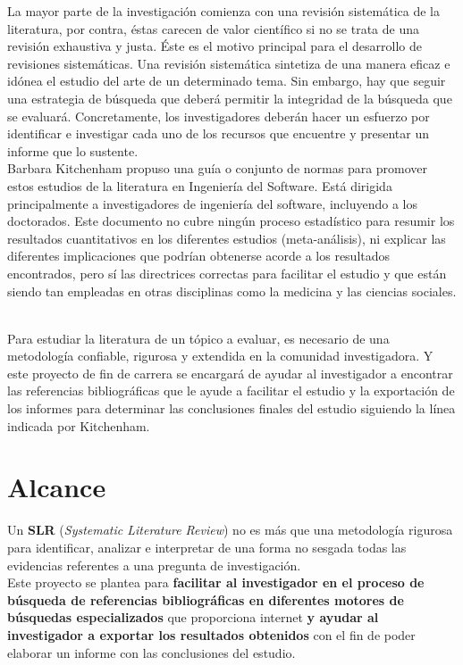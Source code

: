La mayor parte de la investigación comienza con una revisión sistemática de la literatura, por contra, éstas carecen de valor científico si no se trata de una revisión exhaustiva y justa. Éste es el motivo principal para el desarrollo de revisiones sistemáticas. Una revisión sistemática sintetiza de una manera eficaz e idónea el estudio del arte de un determinado tema. Sin embargo, hay que seguir una estrategia de búsqueda que deberá permitir la integridad de la búsqueda que se evaluará. Concretamente, los investigadores deberán hacer un esfuerzo por identificar e investigar cada uno de los recursos que encuentre y presentar un informe que lo sustente.\\

Barbara Kitchenham propuso una guía \cite{kitchenham2007} o conjunto de normas para promover estos estudios de la literatura en Ingeniería del Software. Está dirigida principalmente a investigadores de ingeniería del software, incluyendo a los doctorados. Este documento no cubre ningún proceso estadístico para resumir los resultados cuantitativos en los diferentes estudios (meta-análisis), ni explicar las diferentes implicaciones que podrían obtenerse acorde a los resultados encontrados, pero sí las directrices correctas para facilitar el estudio y que están siendo tan empleadas en otras disciplinas como la medicina y las ciencias sociales.\\\

Para estudiar la literatura de un tópico a evaluar, es necesario de una metodología confiable, rigurosa y extendida en la comunidad investigadora. Y este proyecto de fin de carrera se encargará de ayudar al investigador a encontrar las referencias bibliográficas que le ayude a facilitar el estudio y la exportación de los informes para determinar las conclusiones finales del estudio siguiendo la línea indicada por Kitchenham.\\


\section{Alcance} 
Un \textbf{SLR} (\textit{Systematic Literature Review}) no es más que una metodología rigurosa para identificar, analizar e interpretar de una forma no sesgada todas las evidencias referentes a una pregunta de investigación.\\

Este proyecto se plantea para \textbf{facilitar al investigador en el proceso de búsqueda de referencias bibliográficas en diferentes motores de búsquedas especializados} que proporciona internet \textbf{y ayudar al investigador a exportar los resultados obtenidos} con el fin de poder elaborar un informe con las conclusiones del estudio. \\

